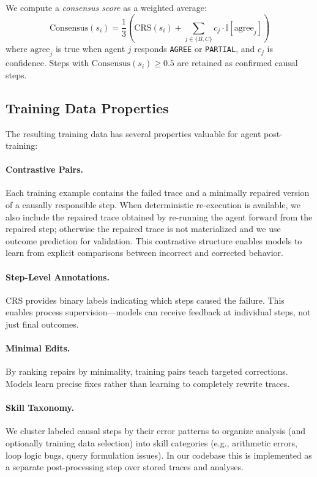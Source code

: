 \documentclass{article}
\theoremstyle{plain}
\theoremstyle{definition}
\theoremstyle{remark}
\begin{document}
We compute a \emph{consensus score} as a weighted average:
\begin{equation}
    \text{Consensus}(s_i) = \frac{1}{3}\left( \text{CRS}(s_i) + \sum_{j \in \{B,C\}} c_j \cdot \mathbb{I}[\text{agree}_j] \right)
\end{equation}
where $\text{agree}_j$ is true when agent $j$ responds \texttt{AGREE} or \texttt{PARTIAL}, and $c_j$ is confidence. Steps with $\text{Consensus}(s_i) \geq 0.5$ are retained as confirmed causal steps.

\subsection{Training Data Properties}

The resulting training data has several properties valuable for agent post-training:

\paragraph{Contrastive Pairs.} Each training example contains the failed trace and a minimally repaired version of a causally responsible step. When deterministic re-execution is available, we also include the repaired trace obtained by re-running the agent forward from the repaired step; otherwise the repaired trace is not materialized and we use outcome prediction for validation. This contrastive structure enables models to learn from explicit comparisons between incorrect and corrected behavior.

\paragraph{Step-Level Annotations.} CRS provides binary labels indicating which steps caused the failure. This enables process supervision---models can receive feedback at individual steps, not just final outcomes.

\paragraph{Minimal Edits.} By ranking repairs by minimality, training pairs teach targeted corrections. Models learn precise fixes rather than learning to completely rewrite traces.

\paragraph{Skill Taxonomy.} We cluster labeled causal steps by their error patterns to organize analysis (and optionally training data selection) into skill categories (e.g., arithmetic errors, loop logic bugs, query formulation issues). In our codebase this is implemented as a separate post-processing step over stored traces and analyses.
\end{document}
